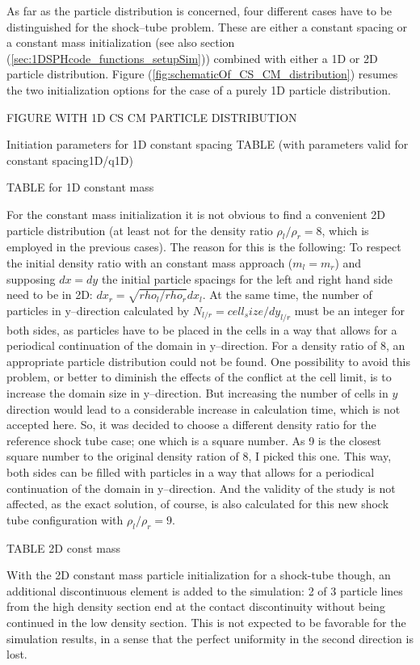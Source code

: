 \documentclass{report}
\begin{document}
As far as the particle distribution is concerned, four different cases have to be distinguished for the shock--tube problem. These are either a constant spacing or a constant mass initialization (see also section (\ref{sec:1DSPHcode_functions_setupSim})) combined with either a 1D or 2D particle distribution.
Figure (\ref{fig:schematicOf_CS_CM_distribution}) resumes the two initialization options for the case of a purely 1D particle distribution.

FIGURE WITH 1D CS CM PARTICLE DISTRIBUTION

Initiation parameters for 1D constant spacing TABLE
(with parameters valid for constant spacing1D/q1D)


TABLE for 1D constant mass


For the constant mass initialization it is not obvious to find a convenient 2D particle distribution (at least not for the density ratio $\rho_l/\rho_r=8$, which is employed in the previous cases). The reason for this is the following:
To respect the initial density ratio with an constant mass approach ($m_l=m_r$) and supposing $dx=dy$ the initial particle spacings for the left and right hand side need to be in 2D: $dx_r=\sqrt{rho_l/rho_r} dx_l$.
At the same time, the number of particles in y--direction calculated by $N_{l/r}=\mathit{cell_size}/dy_{l/r}$ must 
be an integer for both sides, as particles have to be placed in the cells in a way that allows for a periodical continuation of the domain in y--direction.
For a density ratio of 8, an appropriate particle distribution could not be found. One possibility to avoid this problem, or better to diminish the effects of the conflict at the cell limit, is to increase the domain size in y--direction. But increasing the number of cells in $y$ direction would lead to a considerable increase in calculation time, which is not accepted here. So, it was decided to choose a different density ratio for the reference shock tube case; one which is a square number. As 9 is the closest square number to the original density ration of 8, I picked this one.
This way, both sides can be filled with particles in a way that allows for a periodical continuation of the domain in y--direction. And the validity of the study is not affected, as the exact solution, of course, is also calculated for this new shock tube configuration with $\rho_l/\rho_r=9$. 

TABLE 2D const mass

With the 2D constant mass particle initialization for a shock-tube though, an additional discontinuous element is added to the simulation: 2 of 3 particle lines from the high density section end at the contact discontinuity without being continued in the low density section. This is not expected to be favorable for the simulation results, in a sense that the perfect uniformity in the second direction is lost.
\end{document}
